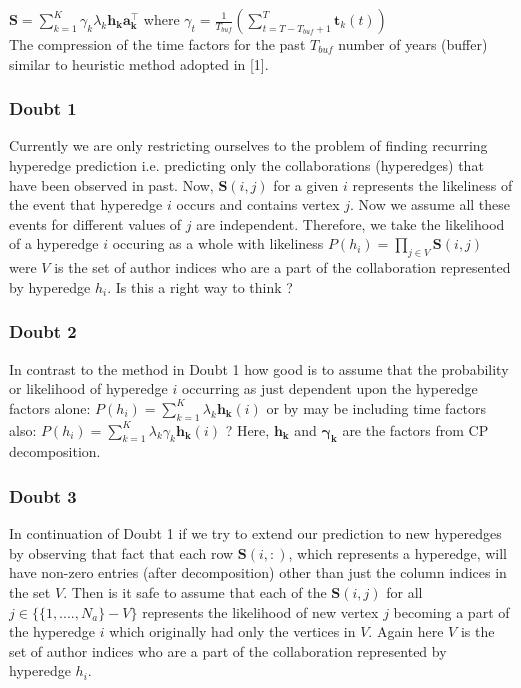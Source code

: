 \documentclass[a4paper,12pt]{article}
\begin{document}
$\mathbf{S} = \sum \limits_{k=1}^{K} \gamma_k \lambda_k \mathbf{h_k} \mathbf{a_k^\top}$ where $\gamma_t = \frac{1}{T_{buf}} \left( \sum \limits_{t=T-T_{buf}+1}^{T} \mathbf{t}_k(t) \right)$ \\

The compression of the time factors for the past $T_{buf}$ number of years (buffer) similar to heuristic method adopted in [1].

\subsubsection{Doubt 1}

Currently we are only restricting ourselves to the problem of finding recurring hyperedge prediction i.e. predicting only the collaborations (hyperedges) that have been observed in past. Now, $\mathbf{S}(i,j)$ for a given $i$ represents the likeliness of the event that hyperedge $i$ occurs and contains vertex $j$. Now we assume all these events for different values of $j$ are independent. Therefore, we take the likelihood of a hyperedge \(i\) occuring as a whole with likeliness \(P(h_{i}) = \prod \limits_{j\in V}\mathbf{S}(i,j) \) were $V$ is the set of author indices who are a part of the collaboration represented by hyperedge $h_{i}$. Is this a right way to think ?

\subsubsection{Doubt 2}

In contrast to the method in Doubt 1 how good is to assume that the probability or likelihood of hyperedge \(i\) occurring as just dependent upon the hyperedge factors alone: \(P(h_{i}) = \sum \limits_{k=1}^{K} \lambda_k \mathbf{h_k}(i) \) or by may be including time factors also: \(P(h_{i}) = \sum \limits_{k=1}^{K} \lambda_k \gamma_{k} \mathbf{h_k}(i) \) ? Here, $\mathbf{h_k}$ and $\mathbf{\gamma_k}$ are the factors from CP decomposition.

\subsubsection{Doubt 3}

In continuation of Doubt 1 if we try to extend our prediction to new hyperedges by observing that fact that each row $\mathbf{S}(i,:)$, which represents a hyperedge, will have non-zero entries (after decomposition) other than just the column indices in the set $V$. Then is it safe to assume that each of the $\mathbf{S}(i,j)$ for all $j \in \{\{1,....,N_a\} - V\}$ represents the likelihood of new vertex $j$ becoming a part of the hyperedge $i$ which originally had only the vertices in $V$. Again here $V$ is the set of author indices who are a part of the collaboration represented by hyperedge $h_{i}$.
\end{document}
